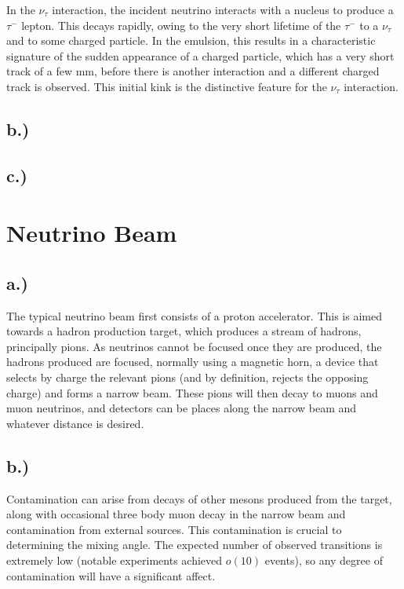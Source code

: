 \documentclass[]{article}
\begin{document}
		In the $\nu_\tau$ interaction, the incident neutrino interacts with a nucleus to produce a $\tau^-$ lepton. This decays rapidly, owing to the very short lifetime of the $\tau^-$ to a $\nu_\tau$ and to some charged particle. In the emulsion, this results in a characteristic signature of the sudden appearance of a charged particle, which has a very short track of a few mm, before there is another interaction and a different charged track is observed. This initial kink is the distinctive feature for the $\nu_\tau$
	   interaction.
	
\subsection{b.) }

\subsection{c.) }

\newpage
		
\section{Neutrino Beam}

	\subsection{a.) }
	
		The typical neutrino beam first consists of a proton accelerator. This is aimed towards a hadron production target, which produces a stream of hadrons, principally pions. As neutrinos cannot be focused once they are produced, the hadrons produced are focused, normally using a magnetic horn, a device that selects by charge the relevant pions (and by definition, rejects the opposing charge) and forms a narrow beam. These pions will then decay to muons and muon neutrinos, and detectors can be places along the narrow beam and whatever distance is desired.
		
	\subsection{b.)}
	
		Contamination can arise from decays of other mesons produced from the target, along with occasional three body muon decay in the narrow beam and contamination from external sources. This contamination is crucial to determining the mixing angle. The expected number of observed transitions is extremely low (notable experiments achieved $o(10)$ events), so any degree of contamination will have a significant affect.
		
\end{document}
